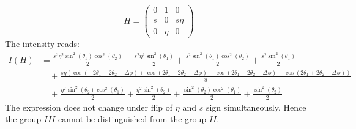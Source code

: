 \documentclass[prd,preprintnumbers,floatfix,
nofootinbib,superscriptaddress]{revtex4}
\newcommand{\II}{\ensuremath{{I\!I}}}
\newcommand{\III}{\ensuremath{{I\!I\!I}}}
\begin{document}
\begin{equation}
  H = \begin{pmatrix}
    0 &1 &0 \\
    s & 0 &s\eta \\
    0 &\eta &0
  \end{pmatrix}
\end{equation}
The intensity reads:
\begin{align}
  I(H) &= \frac{s^{2} \eta^{2} \sin^{2}{\left (\theta_{1} \right )} \cos^{2}{\left (\theta_{2} \right )}}{2} + \frac{s^{2} \eta^{2} \sin^{2}{\left (\theta_{1} \right )}}{2} + \frac{s^{2} \sin^{2}{\left (\theta_{1} \right )} \cos^{2}{\left (\theta_{2} \right )}}{2} + \frac{s^{2} \sin^{2}{\left (\theta_{1} \right )}}{2} \\ \nonumber
   &\quad + \frac{s \eta \left(\cos{\left (- 2 \theta_{1} + 2 \theta_{2} + \Delta\phi \right )} + \cos{\left (2 \theta_{1} - 2 \theta_{2} + \Delta\phi \right )} - \cos{\left (2 \theta_{1} + 2 \theta_{2} - \Delta\phi \right )} - \cos{\left (2 \theta_{1} + 2 \theta_{2} + \Delta\phi \right )}\right)}{8}\\ \nonumber
   &\quad+\frac{\eta^{2} \sin^{2}{\left (\theta_{2} \right )} \cos^{2}{\left (\theta_{1} \right )}}{2} + \frac{\eta^{2} \sin^{2}{\left (\theta_{2} \right )}}{2} + \frac{\sin^{2}{\left (\theta_{2} \right )} \cos^{2}{\left (\theta_{1} \right )}}{2} + \frac{\sin^{2}{\left (\theta_{2} \right )}}{2}
\end{align}
The expression does not change under flip of $\eta$ and $s$ sign simultaneously.
Hence the group-$\III$ cannot be distinguished from the group-$\II$.


\end{document}
